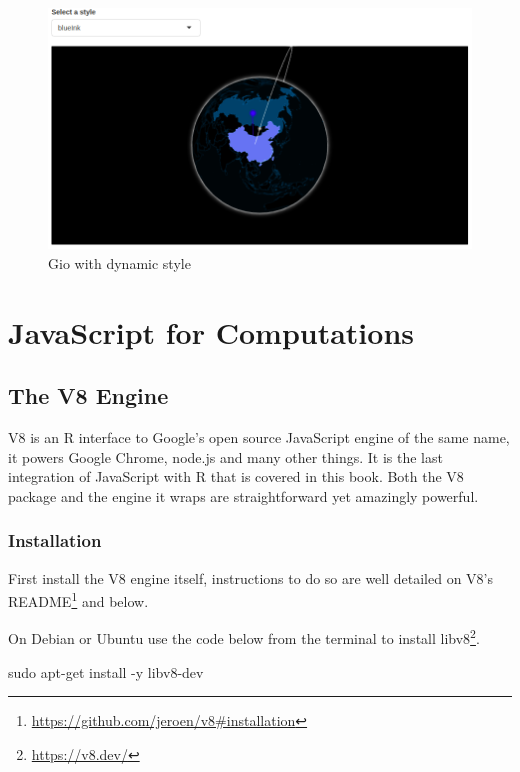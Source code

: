 \documentclass[
]{krantz}
\makeatletter
\newenvironment{Shaded}{\begin{snugshade}}{\end{snugshade}}
\newcommand{\FunctionTok}[1]{\textcolor[rgb]{0,0,0}{#1}}
\newcommand{\NormalTok}[1]{#1}
\renewcommand{\href}[2]{#2\footnote{\url{#1}}}
\newenvironment{kframe}{%
\medskip{}
\setlength{\fboxsep}{.8em}
 \def\at@end@of@kframe{}%
 \ifinner\ifhmode%
  \def\at@end@of@kframe{\end{minipage}}%
  \begin{minipage}{\columnwidth}%
 \fi\fi%
 \def\FrameCommand##1{\hskip\@totalleftmargin \hskip-\fboxsep
 \colorbox{shadecolor}{##1}\hskip-\fboxsep
     \hskip-\linewidth \hskip-\@totalleftmargin \hskip\columnwidth}%
 \MakeFramed {\advance\hsize-\width
   \@totalleftmargin\z@ \linewidth\hsize
   \@setminipage}}%
 {\par\unskip\endMakeFramed%
 \at@end@of@kframe}
\renewenvironment{Shaded}{\begin{kframe}}{\end{kframe}}
\makeatother
\begin{document}
\begin{figure}
\centering
\includegraphics{images/gio-shiny-style.png}
\caption{Gio with dynamic style}
\end{figure}

\hypertarget{part-javascript-for-computations}{%
\part{JavaScript for Computations}\label{part-javascript-for-computations}}

\hypertarget{v8}{%
\chapter{The V8 Engine}\label{v8}}

V8 is an R interface to Google's open source JavaScript engine of the same name, it powers Google Chrome, node.js and many other things. It is the last integration of JavaScript with R that is covered in this book. Both the V8 package and the engine it wraps are straightforward yet amazingly powerful.

\hypertarget{v8-installation}{%
\section{Installation}\label{v8-installation}}

First install the V8 engine itself, instructions to do so are well detailed on \href{https://github.com/jeroen/v8\#installation}{V8's README} and below.

On Debian or Ubuntu use the code below from the terminal to install \href{https://v8.dev/}{libv8}.

\begin{Shaded}
\begin{Highlighting}[]
\FunctionTok{sudo}\NormalTok{ apt{-}get install {-}y libv8{-}dev}
\end{Highlighting}
\end{Shaded}
\end{document}
